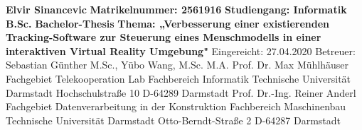 \vspace*{\fill}
\begin{flushleft}
	\textbf{Elvir Sinancevic}
	\newline
	\textbf{Matrikelnummer: 2561916}
	\newline
	\textbf{Studiengang: Informatik B.Sc.}
	\newline\newline
	\textbf{Bachelor-Thesis}
	\newline
	\textbf{Thema: „Verbesserung einer existierenden Tracking-Software zur Steuerung eines Menschmodells in einer interaktiven Virtual Reality Umgebung"}
	\newline\newline
	Eingereicht: 27.04.2020
	\newline\newline
	Betreuer: Sebastian Günther M.Sc., Yübo Wang, M.Sc. M.A.
	\newline\newline
	Prof. Dr. Max Mühlhäuser
	\newline
	Fachgebiet Telekooperation Lab
	\newline
	Fachbereich Informatik
	\newline
	Technische Universität Darmstadt
	\newline
	Hochschulstraße 10
	\newline
	D-64289 Darmstadt
	\newline\newline
	Prof. Dr.-Ing. Reiner Anderl
	\newline
	Fachgebiet Datenverarbeitung in der Konstruktion
	\newline
	Fachbereich Maschinenbau
	\newline
	Technische Universität Darmstadt
	\newline
	Otto-Berndt-Straße 2
	\newline
	D-64287 Darmstadt	
\end{flushleft}
